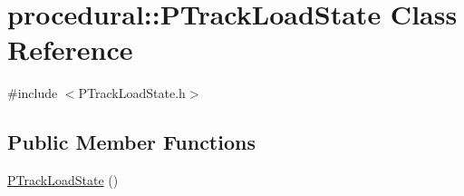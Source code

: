 \hypertarget{classprocedural_1_1_p_track_load_state}{\section{procedural\-:\-:P\-Track\-Load\-State Class Reference}
\label{classprocedural_1_1_p_track_load_state}
}


{\ttfamily \#include $<$P\-Track\-Load\-State.\-h$>$}

\subsection*{Public Member Functions}
\begin{DoxyCompactItemize}
\item 
\hypertarget{classprocedural_1_1_p_track_load_state_aef2ee02a89fd49250bae83447dfc4f65}{\hyperlink{classprocedural_1_1_p_track_load_state_aef2ee02a89fd49250bae83447dfc4f65}{P\-Track\-Load\-State} ()}\label{classprocedural_1_1_p_track_load_state_aef2ee02a89fd49250bae83447dfc4f65}


\end{DoxyCompactItemize}
